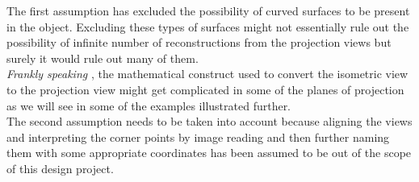 \documentclass[12pt]{report}
\begin{document}
The first assumption has excluded the possibility of curved surfaces to be present in the object. Excluding these types of surfaces might not essentially rule out the possibility of infinite number of reconstructions from the projection views but surely it would rule out many of them. 
\\
\vspace{0.2cm}
\textit{ Frankly speaking } , the mathematical construct used to convert the isometric view to the projection view might get complicated in some of the planes of projection as we will see in some of the examples illustrated further.
\\
\vspace{0.2cm}
The second assumption needs to be taken into account because aligning the views and interpreting the corner points by image reading and then further naming them with some appropriate coordinates has been assumed to be out of the scope of this design project.
%

\nextpage
\end{document}
